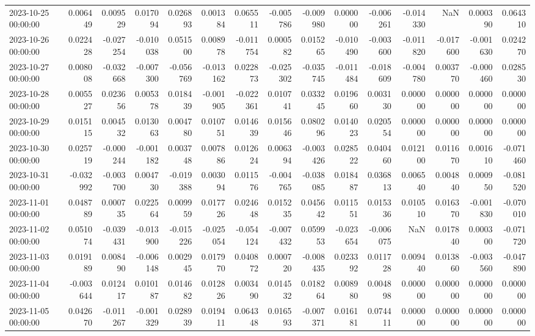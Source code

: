 \begin{tabular}{lrrrrrrrrrrrrrr}
2023-10-25 00:00:00 & 0.006449 & 0.009529 & 0.017094 & 0.026893 & 0.001384 & 0.065511 & -0.005786 & -0.009980 & 0.000000 & -0.006261 & -0.014330 & NaN & 0.000390 & 0.064310 \\
2023-10-26 00:00:00 & 0.022428 & -0.027254 & -0.010038 & 0.051500 & 0.008978 & -0.011754 & 0.000582 & 0.015265 & -0.010490 & -0.003600 & -0.011820 & -0.017600 & -0.001630 & 0.024270 \\
2023-10-27 00:00:00 & 0.008008 & -0.032668 & -0.007300 & -0.056769 & -0.013162 & 0.022873 & -0.025302 & -0.035745 & -0.011484 & -0.018609 & -0.004780 & 0.003770 & -0.000460 & 0.028530 \\
2023-10-28 00:00:00 & 0.005527 & 0.023656 & 0.005378 & 0.018439 & -0.001905 & -0.022361 & 0.010741 & 0.033245 & 0.019660 & 0.003130 & 0.000000 & 0.000000 & 0.000000 & 0.000000 \\
2023-10-29 00:00:00 & 0.015115 & 0.004532 & 0.013063 & 0.004780 & 0.010751 & 0.014639 & 0.015646 & 0.080296 & 0.014023 & 0.020554 & 0.000000 & 0.000000 & 0.000000 & 0.000000 \\
2023-10-30 00:00:00 & 0.025719 & -0.000244 & -0.001182 & 0.003748 & 0.007886 & 0.012624 & 0.006394 & -0.003426 & 0.028522 & 0.040460 & 0.012100 & 0.011670 & 0.001610 & -0.071460 \\
2023-10-31 00:00:00 & -0.032992 & -0.003700 & 0.004730 & -0.019388 & 0.003094 & 0.011576 & -0.004765 & -0.038085 & 0.018487 & 0.036813 & 0.006540 & 0.004840 & 0.000950 & -0.081520 \\
2023-11-01 00:00:00 & 0.048789 & 0.000735 & 0.022564 & 0.009959 & 0.017726 & 0.024648 & 0.015235 & 0.045642 & 0.011551 & 0.015336 & 0.010510 & 0.016370 & -0.001830 & -0.070010 \\
2023-11-02 00:00:00 & 0.051074 & -0.039431 & -0.013900 & -0.015226 & -0.025054 & -0.054124 & -0.007432 & 0.059953 & -0.023654 & -0.006075 & NaN & 0.017840 & 0.000300 & -0.071720 \\
2023-11-03 00:00:00 & 0.019189 & 0.008490 & -0.006148 & 0.002945 & 0.017970 & 0.040872 & 0.000720 & -0.008435 & 0.023392 & 0.011728 & 0.009440 & 0.013860 & -0.003560 & -0.047890 \\
2023-11-04 00:00:00 & -0.003644 & 0.012417 & 0.010187 & 0.014682 & 0.012826 & 0.003490 & 0.014532 & 0.018264 & 0.008980 & 0.004898 & 0.000000 & 0.000000 & 0.000000 & 0.000000 \\
2023-11-05 00:00:00 & 0.042670 & -0.011267 & -0.001329 & 0.028939 & 0.019411 & 0.064348 & 0.016593 & -0.007371 & 0.016181 & 0.074411 & 0.000000 & 0.000000 & 0.000000 & 0.000000 \\

\end{tabular}
